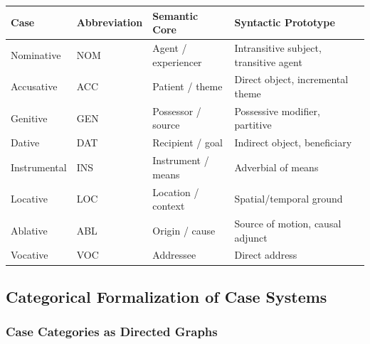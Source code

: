 \documentclass[
]{article}
\newcounter{none} %
\numberwithin{equation}{section}
\begin{document}
{\def\LTcaptype{none} %
\begin{longtable}[]{@{}
  >{\raggedright\arraybackslash}p{}
  >{\centering\arraybackslash}p{}
  >{\raggedright\arraybackslash}p{}
  >{\raggedright\arraybackslash}p{}@{}}
\toprule\noalign{}
\begin{minipage}[b]{\linewidth}\raggedright
Case
\end{minipage} & \begin{minipage}[b]{\linewidth}\centering
Abbreviation
\end{minipage} & \begin{minipage}[b]{\linewidth}\raggedright
Semantic Core
\end{minipage} & \begin{minipage}[b]{\linewidth}\raggedright
Syntactic Prototype
\end{minipage} \\
\midrule\noalign{}
\endhead
\bottomrule\noalign{}
\endlastfoot
Nominative & NOM & Agent / experiencer & Intransitive subject,
transitive agent \\
Accusative & ACC & Patient / theme & Direct object, incremental theme \\
Genitive & GEN & Possessor / source & Possessive modifier, partitive \\
Dative & DAT & Recipient / goal & Indirect object, beneficiary \\
Instrumental & INS & Instrument / means & Adverbial of means \\
Locative & LOC & Location / context & Spatial/temporal ground \\
Ablative & ABL & Origin / cause & Source of motion, causal adjunct \\
Vocative & VOC & Addressee & Direct address \\
\end{longtable}
}

\subsection{Categorical Formalization of Case
Systems}\label{categorical-formalization-of-case-systems}

\subsubsection{Case Categories as Directed
Graphs}\label{case-categories-as-directed-graphs}
\end{document}
